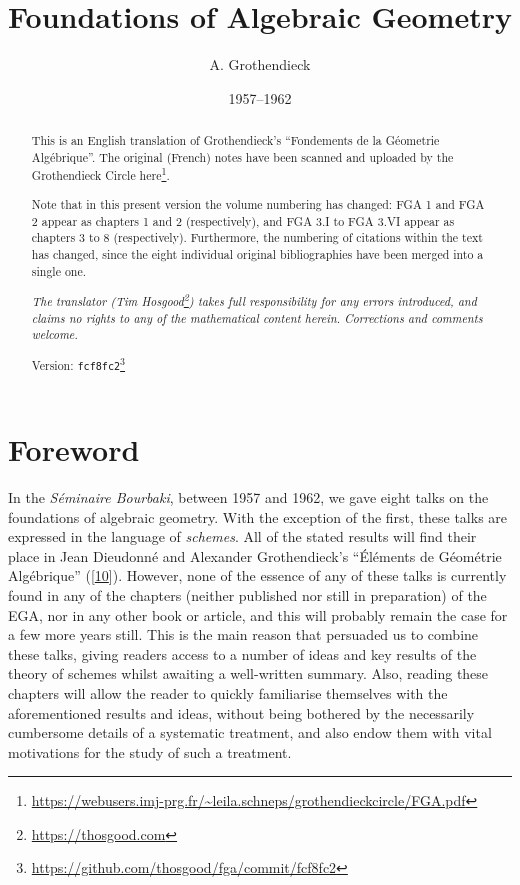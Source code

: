 \documentclass{article}
\title{Foundations of Algebraic Geometry}
\author{A. Grothendieck}
\date{1957--1962}
\renewcommand{\href}[2]{#2\footnote{\url{#1}}}
\newcommand{\oldpage}[1]{\marginpar{\footnotesize$\Big\vert$ \textit{p.~#1}}}
\theoremstyle{definition}
\theoremstyle{definition}
\theoremstyle{definition}
\theoremstyle{definition}
\theoremstyle{remark}
\begin{document}
\maketitle
\thispagestyle{fancy}

\renewcommand{\abstractname}{Translator's note}

\setcounter{footnote}{0}

\tableofcontents



\leavevmode{}%
\begin{abstract}
This is an English translation of Grothendieck's ``Fondements de la Géometrie Algébrique''.
The original (French) notes have been scanned and uploaded by the Grothendieck Circle \href{https://webusers.imj-prg.fr/~leila.schneps/grothendieckcircle/FGA.pdf}{here}.

Note that in this present version the volume numbering has changed: FGA 1 and FGA 2 appear as chapters 1 and 2 (respectively), and FGA 3.I to FGA 3.VI appear as chapters 3 to 8 (respectively).
Furthermore, the numbering of citations within the text has changed, since the eight individual original bibliographies have been merged into a single one.

\emph{The translator (\href{https://thosgood.com}{Tim Hosgood}) takes full responsibility for any errors introduced, and claims no rights to any of the mathematical content herein.}
\emph{Corrections and comments welcome.}

Version: \href{https://github.com/thosgood/fga/commit/fcf8fc2}{\texttt{fcf8fc2}}

\end{abstract}

\hypertarget{foreword}{%
\section*{Foreword}\label{foreword}}

\oldpage{C-01}

In the \emph{Séminaire Bourbaki}, between 1957 and 1962, we gave eight talks on the foundations of algebraic geometry.
With the exception of the first, these talks are expressed in the language of \emph{schemes}.
All of the stated results will find their place in Jean Dieudonné and Alexander Grothendieck's ``Éléments de Géométrie Algébrique'' ({[}\protect\hyperlink{ref-GD1960}{10}{]}).
However, none of the essence of any of these talks is currently found in any of the chapters (neither published nor still in preparation) of the EGA, nor in any other book or article, and this will probably remain the case for a few more years still.
This is the main reason that persuaded us to combine these talks, giving readers access to a number of ideas and key results of the theory of schemes whilst awaiting a well-written summary.
Also, reading these chapters will allow the reader to quickly familiarise themselves with the aforementioned results and ideas, without being bothered by the necessarily cumbersome details of a systematic treatment, and also endow them with vital motivations for the study of such a treatment.
\end{document}
